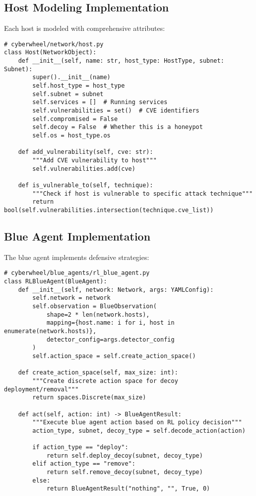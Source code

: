 \documentclass[12pt,a4paper]{article}
\begin{document}
\subsection{Host Modeling Implementation}
Each host is modeled with comprehensive attributes:

\begin{lstlisting}[caption=Host Implementation]
# cyberwheel/network/host.py
class Host(NetworkObject):
    def __init__(self, name: str, host_type: HostType, subnet: Subnet):
        super().__init__(name)
        self.host_type = host_type
        self.subnet = subnet
        self.services = []  # Running services
        self.vulnerabilities = set()  # CVE identifiers
        self.compromised = False
        self.decoy = False  # Whether this is a honeypot
        self.os = host_type.os
        
    def add_vulnerability(self, cve: str):
        """Add CVE vulnerability to host"""
        self.vulnerabilities.add(cve)
        
    def is_vulnerable_to(self, technique):
        """Check if host is vulnerable to specific attack technique"""
        return bool(self.vulnerabilities.intersection(technique.cve_list))
\end{lstlisting}

\subsection{Blue Agent Implementation}
The blue agent implements defensive strategies:

\begin{lstlisting}[caption=Blue Agent Base Implementation]
# cyberwheel/blue_agents/rl_blue_agent.py
class RLBlueAgent(BlueAgent):
    def __init__(self, network: Network, args: YAMLConfig):
        self.network = network
        self.observation = BlueObservation(
            shape=2 * len(network.hosts),
            mapping={host.name: i for i, host in enumerate(network.hosts)},
            detector_config=args.detector_config
        )
        self.action_space = self.create_action_space()
        
    def create_action_space(self, max_size: int):
        """Create discrete action space for decoy deployment/removal"""
        return spaces.Discrete(max_size)
        
    def act(self, action: int) -> BlueAgentResult:
        """Execute blue agent action based on RL policy decision"""
        action_type, subnet, decoy_type = self.decode_action(action)
        
        if action_type == "deploy":
            return self.deploy_decoy(subnet, decoy_type)
        elif action_type == "remove":
            return self.remove_decoy(subnet, decoy_type)
        else:
            return BlueAgentResult("nothing", "", True, 0)
\end{lstlisting}
\end{document}
